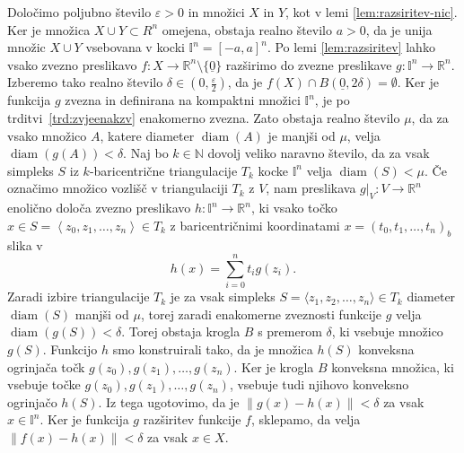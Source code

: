 \documentclass[mat1]{fmfdelo}
\newcommand{\R}{\mathbb R}
\newcommand{\N}{\mathbb N}
\DeclareMathOperator{\diam}{diam}
\newcommand{\I}{\mathbb I}
\newcommand{\0}{\underline{0}}
\begin{document}
\begin{dokaz}
Določimo poljubno število $\varepsilon > 0$ in množici $X$ in $Y$, kot v lemi \ref{lem:razsiritev-nic}. Ker je množica $X \cup Y \subset R^n$ omejena, obstaja realno število $a > 0$, da je unija množic $X \cup Y$ vsebovana v kocki $\I^n = \left [ -a, a \right ]^n$. Po lemi \ref{lem:razsiritev} lahko vsako zvezno preslikavo $f : X \to \R^n \setminus \{ \0 \}$ razširimo do zvezne preslikave $g : \I^n \to \R^n$. Izberemo tako realno število $\delta \in (0, \frac{\varepsilon}{2})$, da je $f(X) \cap B( \0, 2\delta) = \emptyset$. Ker je funkcija $g$ zvezna in definirana na kompaktni množici $\I^n$, je po trditvi~\ref{trd:zvjeenakzv} enakomerno zvezna. Zato obstaja realno število $\mu$, da za vsako množico $A$, katere diameter $\diam(A)$ je manjši od $\mu$, velja $\diam(g(A)) < \delta$. Naj bo $k \in \N$ dovolj veliko naravno število, da za vsak simpleks $S$ iz $k$-baricentrične triangulacije $T_k$ kocke $\I^n$ velja $\diam(S) < \mu$. Če označimo množico vozlišč v triangulaciji $T_k$ z $V$, nam preslikava $g|_V : V \to \R^n$ enolično določa zvezno preslikavo $h : \I^n \to \R^n$, ki vsako točko $x \in S = \left < z_0, z_1, \dots, z_n \right > \in T_k$ z baricentričnimi koordinatami $x = (t_0, t_1, \dots, t_n)_b$ slika v 
$$h(x) = \sum_{i=0}^n t_i g(z_i).$$
Zaradi izbire triangulacije $T_k$ je za vsak simpleks $S = \langle  z_1, z_2, \dots, z_n \rangle \in T_k$ diameter $\diam(S)$ manjši od $\mu$, torej zaradi enakomerne zveznosti funkcije $g$ velja $\diam (g(S)) < \delta$. Torej obstaja krogla $B$ s premerom $\delta$, ki vsebuje množico $g(S)$. Funkcijo $h$ smo konstruirali tako, da je množica $h(S)$ konveksna ogrinjača točk $g(z_0), g(z_1), \dots, g(z_n)$. Ker je krogla $B$ konveksna množica, ki vsebuje točke $g(z_0), g(z_1), \dots, g(z_n)$, vsebuje tudi njihovo konveksno ogrinjačo $h(S)$. Iz tega ugotovimo, da je $\| g(x) - h(x) \| < \delta$ za vsak $x \in \I^n$. Ker je funkcija $g$ razširitev funkcije $f$, sklepamo, da velja $\| f(x) - h(x) \| < \delta$ za vsak $x \in X$.


\end{dokaz}
\end{document}
